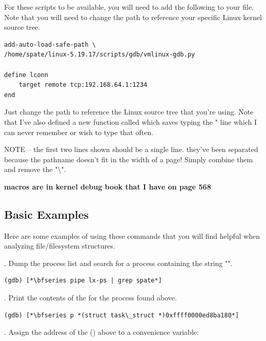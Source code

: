 \noindent
For these scripts to be available, you will need to add the following to your  file. Note that you will need to change the path to reference your specific Linux kernel source tree.

\begin{lstlisting}
add-auto-load-safe-path \
/home/spate/linux-5.19.17/scripts/gdb/vmlinux-gdb.py

define lconn
    target remote tcp:192.168.64.1:1234
end
\end{lstlisting}

\noindent
Just change the path to reference the Linux source tree that you're using. Note that I've also defined a new function called  which saves typing the " line which I can never remember or wish to type that often.

NOTE -- the first two lines shown should be a single line. they've been separated because the pathname doesn't fit in the width of a page! Simply combine them and remove the "\textbackslash".

\textbf{macros are in kernel debug book that I have on page 568}


\subsection{Basic  Examples}

Here are some examples of using these commands that you will find helpful when analyzing file/filesystem structures. 

\bigskip
{}. Dump the process list and search for a process containing the string "".

\begin{lstlisting}
(gdb) [*\bfseries pipe lx-ps | grep spate*]
\end{lstlisting}

. Print the contents of the  for the process found above. 

\begin{lstlisting}
(gdb) [*\bfseries p *(struct task\_struct *)0xffff0000ed8ba180*]
\end{lstlisting}

. Assign the address of the () above to a convenience variable:

